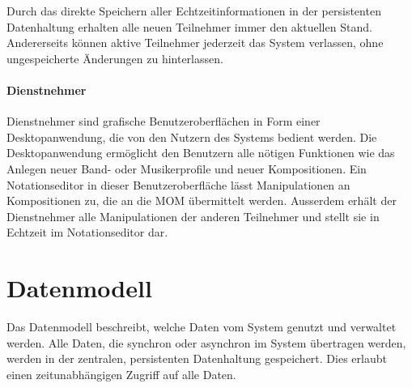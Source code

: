 \documentclass[12pt]{scrartcl}
\begin{document}
Durch das direkte Speichern aller Echtzeitinformationen in der persistenten Datenhaltung erhalten alle neuen Teilnehmer immer den aktuellen Stand. Andererseits können aktive Teilnehmer jederzeit das System verlassen, ohne ungespeicherte Änderungen zu hinterlassen.

\paragraph{Dienstnehmer}
Dienstnehmer sind grafische Benutzeroberflächen in Form einer Desktopanwendung, die von den Nutzern des Systems bedient werden. Die Desktopanwendung ermöglicht den Benutzern alle nötigen Funktionen wie das Anlegen neuer Band- oder Musikerprofile und neuer Kompositionen. Ein Notationseditor in dieser Benutzeroberfläche lässt Manipulationen an Kompositionen zu, die an die MOM übermittelt werden. Ausserdem erhält der Dienstnehmer alle Manipulationen der anderen Teilnehmer und stellt sie in Echtzeit im Notationseditor dar.



\section{Datenmodell}
\label{sec:datenmodell}


Das Datenmodell beschreibt, welche Daten vom System genutzt und verwaltet werden. Alle Daten, die synchron oder asynchron im System übertragen werden, werden in der zentralen, persistenten Datenhaltung gespeichert. Dies erlaubt einen zeitunabhängigen Zugriff auf alle Daten. 
\end{document}
